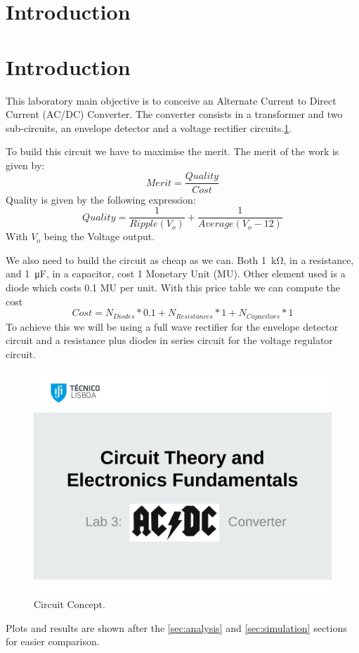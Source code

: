 \section{Introduction}

\section{Introduction}

This laboratory main objective is to conceive an Alternate Current to Direct Current (AC/DC) Converter. The converter consists in a transformer and two sub-circuits, an envelope detector and a voltage rectifier circuits.\ref{Fig1: circuit}.

To build this circuit we have to maximise the merit. The merit of the work is given by:
\begin{equation}
    Merit = \dfrac{Quality}{Cost}
\end{equation}
Quality is given by the following expression:
\begin{equation}
    Quality = \dfrac{1}{Ripple(V_o)} + \dfrac{1}{Average(V_o-12)} 
\end{equation}
With $V_o$ being the Voltage output.

We also need to build the circuit as cheap as we can. Both \SI{1}{\kilo\ohm}, in a resistance, and \SI{1}{\micro\farad}, in a capacitor, cost 1 Monetary Unit (MU). Other element used is a diode which costs 0.1 MU per unit.
With this price table we can compute the cost
\begin{equation}
    Cost = N_{Diodes}*0.1+N_{Resistances}*1+N_{Capacitors}*1
\end{equation}
To achieve this we will be using a full wave rectifier for the envelope detector circuit and a resistance plus diodes in series circuit for the voltage regulator circuit.

\begin{figure}[h] 
\centering
\includegraphics[width=0.6\linewidth]{t3.pdf}
\caption{Circuit Concept.}
\label{Fig1: circuit}
\end{figure}

Plots and results are shown after the \ref{sec:analysis} and \ref{sec:simulation} sections for easier comparison.
